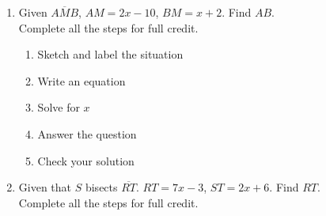 \documentclass[12pt, twoside]{article}
\begin{document}
\begin{enumerate}
\item Given $\overline{AMB}$, $AM=2x-10$, $BM=x+2$. Find ${AB}$.\\
Complete all the steps for full credit. \smallskip
  \begin{enumerate}
    \item Sketch and label the situation
    \item Write an equation
    \item Solve for $x$
    \item Answer the question
    \item Check your solution
  \end{enumerate}

\vspace{4cm}

\item Given that $S$ bisects $\overline{RT}$. $RT=7x-3$, $ST=2x+6$. Find ${RT}$.\\
Complete all the steps for full credit.

\end{enumerate}
\end{document}
